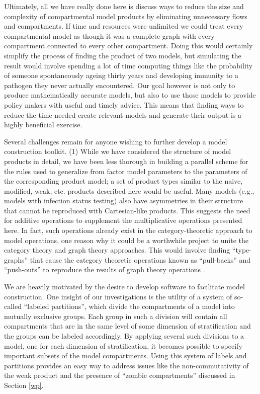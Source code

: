 Ultimately, all we have really done here is discuss ways to reduce the size and complexity of compartmental model products by eliminating unnecessary flows and compartments. If time and resources were unlimited we could treat every compartmental model as though it was a complete graph with every compartment connected to every other compartment. Doing this would certainly simplify the process of finding the product of two models, but simulating the result would involve spending a lot of time computing things like the probability of someone spontaneously ageing thirty years and developing immunity to a pathogen they never actually encountered. Our goal however is not only to produce mathematically accurate models, but also to use those models to provide policy makers with useful and timely advice. This means that finding ways to reduce the time needed create relevant models and generate their output is a highly beneficial exercise.

Several challenges remain for anyone wishing to further develop a model construction toolkit. (1) While we have considered the structure of model products in detail, we have been less thorough in building a parallel scheme for the rules used to generalize from factor model parameters to the parameters of the corresponding product model; a set of product types similar to the naive, modified, weak, etc. products described here would be useful. Many models (e.g., models with infection status testing) also have asymmetries in their structure that cannot be reproduced with Cartesian-like products. This suggests the need for additive operations to supplement the multiplicative operations presented here. In fact, such operations already exist in the category-theoretic approach to model operations, one reason why it could be a worthwhile project to unite the category theory and graph theory approaches. This would involve finding ``type-graphs'' that cause the category theoretic operations known as ``pull-backs'' and ``push-outs'' to  reproduce the results of graph theory operations \citep{fong2018seven, Libkind2022an, libkind2021operadic, baez2023categorical, baez2017compositional}.

We are heavily motivated by the desire to develop software to facilitate model construction. One insight of our investigations is the utility of a system of so-called ``labeled partitions'', which divide the compartments of a model into mutually exclusive groups. Each group in such a division will contain all compartments that are in the same level of some dimension of stratification and the groups can be labeled accordingly. By applying several such divisions to a model, one for each dimension of stratification, it becomes possible to specify important subsets of the model compartments. Using this system of labels and partitions provides an easy way to address issues like the non-commutativity of the weak product and the presence of ``zombie compartments'' discussed in Section \ref{wp}.

